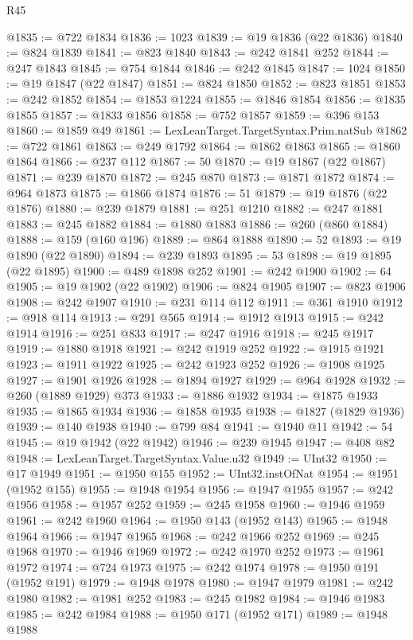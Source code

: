 \begin{lexlean}{R45}
\begin{coremodule}
{@1835 := @722 @1834
@1836 := 1023
@1839 := @19 @1836 (@22 @1836)
@1840 := @824 @1839
@1841 := @823 @1840
@1843 := @242 @1841 @252
@1844 := @247 @1843
@1845 := @754 @1844
@1846 := @242 @1845
@1847 := 1024
@1850 := @19 @1847 (@22 @1847)
@1851 := @824 @1850
@1852 := @823 @1851
@1853 := @242 @1852
@1854 := @1853 @1224
@1855 := @1846 @1854
@1856 := @1835 @1855
@1857 := @1833 @1856
@1858 := @752 @1857
@1859 := @396 @153
@1860 := @1859 @49
@1861 := LexLeanTarget.TargetSyntax.Prim.natSub
@1862 := @722 @1861
@1863 := @249 @1792
@1864 := @1862 @1863
@1865 := @1860 @1864
@1866 := @237 @112
@1867 := 50
@1870 := @19 @1867 (@22 @1867)
@1871 := @239 @1870
@1872 := @245 @870
@1873 := @1871 @1872
@1874 := @964 @1873
@1875 := @1866 @1874
@1876 := 51
@1879 := @19 @1876 (@22 @1876)
@1880 := @239 @1879
@1881 := @251 @1210
@1882 := @247 @1881
@1883 := @245 @1882
@1884 := @1880 @1883
@1886 := @260 (@860 @1884)
@1888 := @159 (@160 @196)
@1889 := @864 @1888
@1890 := 52
@1893 := @19 @1890 (@22 @1890)
@1894 := @239 @1893
@1895 := 53
@1898 := @19 @1895 (@22 @1895)
@1900 := @489 @1898 @252
@1901 := @242 @1900
@1902 := 64
@1905 := @19 @1902 (@22 @1902)
@1906 := @824 @1905
@1907 := @823 @1906
@1908 := @242 @1907
@1910 := @231 @114 @112
@1911 := @361 @1910
@1912 := @918 @114
@1913 := @291 @565
@1914 := @1912 @1913
@1915 := @242 @1914
@1916 := @251 @833
@1917 := @247 @1916
@1918 := @245 @1917
@1919 := @1880 @1918
@1921 := @242 @1919 @252
@1922 := @1915 @1921
@1923 := @1911 @1922
@1925 := @242 @1923 @252
@1926 := @1908 @1925
@1927 := @1901 @1926
@1928 := @1894 @1927
@1929 := @964 @1928
@1932 := @260 (@1889 @1929) @373
@1933 := @1886 @1932
@1934 := @1875 @1933
@1935 := @1865 @1934
@1936 := @1858 @1935
@1938 := @1827 (@1829 @1936)
@1939 := @140 @1938
@1940 := @799 @84
@1941 := @1940 @11
@1942 := 54
@1945 := @19 @1942 (@22 @1942)
@1946 := @239 @1945
@1947 := @408 @82
@1948 := LexLeanTarget.TargetSyntax.Value.u32
@1949 := UInt32
@1950 := @17 @1949
@1951 := @1950 @155
@1952 := UInt32.instOfNat
@1954 := @1951 (@1952 @155)
@1955 := @1948 @1954
@1956 := @1947 @1955
@1957 := @242 @1956
@1958 := @1957 @252
@1959 := @245 @1958
@1960 := @1946 @1959
@1961 := @242 @1960
@1964 := @1950 @143 (@1952 @143)
@1965 := @1948 @1964
@1966 := @1947 @1965
@1968 := @242 @1966 @252
@1969 := @245 @1968
@1970 := @1946 @1969
@1972 := @242 @1970 @252
@1973 := @1961 @1972
@1974 := @724 @1973
@1975 := @242 @1974
@1978 := @1950 @191 (@1952 @191)
@1979 := @1948 @1978
@1980 := @1947 @1979
@1981 := @242 @1980
@1982 := @1981 @252
@1983 := @245 @1982
@1984 := @1946 @1983
@1985 := @242 @1984
@1988 := @1950 @171 (@1952 @171)
@1989 := @1948 @1988
}
\end{coremodule}
\end{lexlean}
